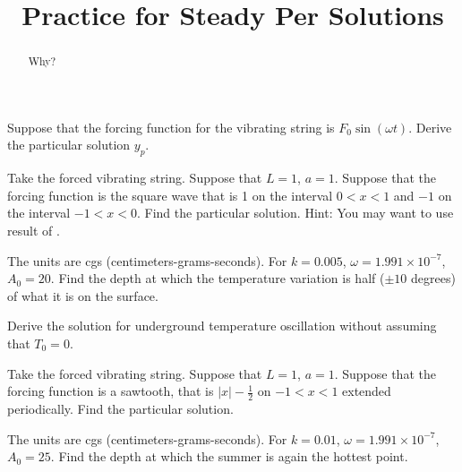 \documentclass{ximera}
\title{Practice for Steady Per Solutions}
\begin{document}
\begin{abstract}
Why?
\end{abstract}
\maketitle


\begin{exercise} \label{sps:sinforceexr}
    Suppose that the forcing function for the vibrating string is $F_0 \sin (\omega t)$.  Derive the particular solution $y_p$.
\end{exercise}

\begin{exercise}
    Take the forced vibrating string. Suppose that $L=1$, $a=1$.  Suppose that the forcing function is the square wave that is 1 on the interval $0 < x < 1$ and $-1$ on the interval $-1 < x< 0$. Find the particular solution.  Hint: You may want to use result of .
\end{exercise}

\begin{exercise}
    The units are cgs (centimeters-grams-seconds). For $k=0.005$, $\omega = 1.991 \times {10}^{-7}$, $A_0 = 20$. Find the depth at which the temperature variation is half ($\pm 10$ degrees) of what it is on the surface.
\end{exercise}

\begin{exercise}
    Derive the solution for underground temperature oscillation without assuming that $T_0 = 0$.
\end{exercise}


\begin{exercise}
    Take the forced vibrating string. Suppose that $L=1$, $a=1$.  Suppose that the forcing function is a sawtooth, that is $\lvert x \rvert -\frac{1}{2}$ on $-1 < x < 1$ extended periodically. Find the particular solution.
\end{exercise}

\begin{exercise}
    The units are cgs (centimeters-grams-seconds). For $k=0.01$, $\omega = 1.991 \times {10}^{-7}$, $A_0 = 25$. Find the depth at which the summer is again the hottest point.
\end{exercise}
\end{document}
